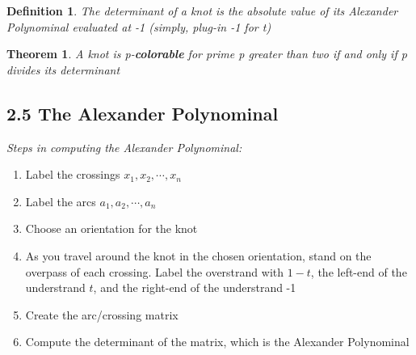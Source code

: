 \documentclass[executivepaper]{article}
\newtheorem{definition}{Definition}
\newtheorem{theorem}{Theorem}
\begin{document}
\begin{tcolorbox}

\begin{definition}

\textit{The determinant of a knot is the absolute value of its Alexander Polynominal evaluated at -1 (simply, plug-in -1 for t)}

\end{definition}

\end{tcolorbox}

\vspace{2mm}

\begin{tcolorbox}

\begin{theorem}

\textit{A knot is p-\textbf{colorable} for prime p greater than two if and only if p divides its determinant}

\end{theorem}

\end{tcolorbox}

\subsection*{2.5 The Alexander Polynominal}

\begin{tcolorbox}

\textit{Steps in computing the Alexander Polynominal:}

\begin{center}

\begin{enumerate}

\item Label the crossings $x_{1}, x_{2}, \cdots, x_{n}$

\item Label the arcs $a_{1}, a_{2}, \cdots, a_{n}$

\item Choose an orientation for the knot

\item As you travel around the knot in the chosen orientation, stand on the overpass of each crossing. Label the overstrand with $1-t$, the left-end of the understrand $t$, and the right-end of the understrand -1

\item Create the arc/crossing matrix

\item Compute the determinant of the matrix, which is the Alexander Polynominal

\end{enumerate}

\end{center}

\end{tcolorbox}
\end{document}
